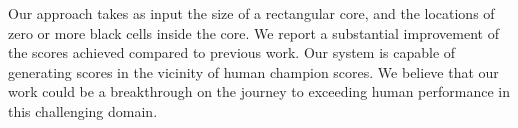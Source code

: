 
Our approach takes as input the size of a rectangular core,
and the locations of zero or more black cells inside the core.
We report a substantial improvement of the scores achieved compared
to previous work.
Our system is capable of generating scores in the vicinity of human champion scores.
We believe that our work could be a breakthrough on the journey to exceeding
human performance in this challenging domain.